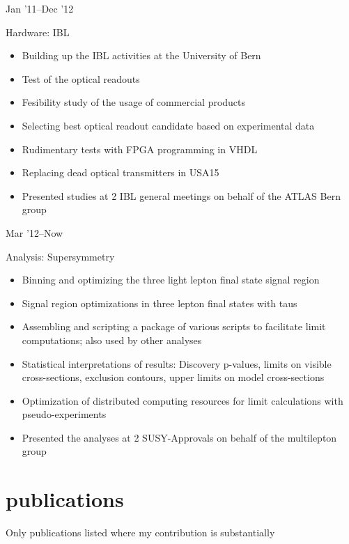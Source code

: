 \documentclass[]{cv} %
\begin{document}
\begin{entrylist}

  \entry
  {Jan '11--Dec '12}
  {Hardware: IBL{\normalfont
    \begin{itemize}
      \item Building up the IBL activities at the University of Bern
      \item Test of the optical readouts
      \item Fesibility study of the usage of commercial products
      \item Selecting best optical readout candidate based on experimental data
      \item Rudimentary tests with FPGA programming in VHDL
      \item Replacing dead optical transmitters in USA15
      \item Presented studies at 2 IBL general meetings on behalf of the ATLAS Bern group
  \end{itemize}}}
  {}
  {\vspace*{-22pt}}

\entry
{Mar '12--Now}
{Analysis: Supersymmetry{\normalfont
  \begin{itemize}
  \item Binning and optimizing the three light lepton final state signal region
  \item Signal region optimizations in three lepton final states with taus
  \item Assembling and scripting a package of various scripts to facilitate limit computations; also used by other analyses
  \item Statistical interpretations of results: Discovery p-values, limits on visible cross-sections, exclusion contours, upper limits on model cross-sections
  \item Optimization of distributed computing resources for limit calculations with pseudo-experiments
  \item Presented the analyses at 2 SUSY-Approvals on behalf of the multilepton group
\end{itemize}}}
{}
  {\vspace*{-22pt}}

\end{entrylist}

\section{publications}
Only publications listed where my contribution is substantially
\end{document}

